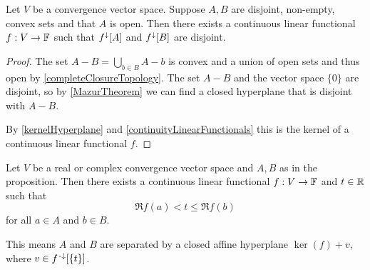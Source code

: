 \begin{theorem} \label{HahnBanachSeparation}
Let $V$ be a convergence vector space. Suppose $A,B$ are disjoint, non-empty, convex sets and that $A$ is open. Then there exists a continuous linear functional $f:V\to \mathbb{F}$ such that $f^\downarrow[A]$ and $f^\downarrow[B]$ are disjoint.
\end{theorem}
\begin{proof}
The set $A-B = \bigcup_{b\in B}A-b$ is convex and a union of open sets and thus open by \ref{completeClosureTopology}.
The set $A-B$ and the vector space $\{0\}$ are disjoint, so by \ref{MazurTheorem} we can find a closed hyperplane that is disjoint with $A-B$.

By \ref{kernelHyperplane} and \ref{continuityLinearFunctionals} this is the kernel of a continuous linear functional $f$.
\end{proof}
\begin{corollary}
Let $V$ be a real or complex convergence vector space and $A,B$ as in the proposition. Then there exists a continuous linear functional $f:V\to \mathbb{F}$ and $t\in \mathbb{R}$ such that
\[ \Re f(a) < t \leq \Re f(b) \]
for all $a\in A$ and $b\in B$.
\end{corollary}
This means $A$ and $B$ are separated by a closed affine hyperplane $\ker(f)+v$, where $v \in f^{\text{\hspace{0.15em}-}\downarrow}[\{t\}]$.

